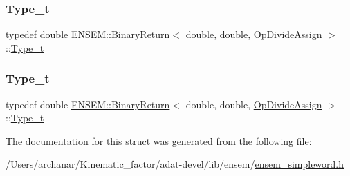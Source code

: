 \mbox{\label{structENSEM_1_1BinaryReturn_3_01double_00_01double_00_01OpDivideAssign_01_4_aa4a7939a8bbedada7f3b6703da6902f7}} 
\subsubsection{\texorpdfstring{Type\_t}{Type\_t}\hspace{0.1cm}{\footnotesize\ttfamily [2/3]}}
{\footnotesize\ttfamily typedef double \mbox{\hyperlink{structENSEM_1_1BinaryReturn}{E\+N\+S\+E\+M\+::\+Binary\+Return}}$<$ double, double, \mbox{\hyperlink{structENSEM_1_1OpDivideAssign}{Op\+Divide\+Assign}} $>$\+::\mbox{\hyperlink{structENSEM_1_1BinaryReturn_3_01double_00_01double_00_01OpDivideAssign_01_4_aa4a7939a8bbedada7f3b6703da6902f7}{Type\+\_\+t}}}

\mbox{\label{structENSEM_1_1BinaryReturn_3_01double_00_01double_00_01OpDivideAssign_01_4_aa4a7939a8bbedada7f3b6703da6902f7}} 
\subsubsection{\texorpdfstring{Type\_t}{Type\_t}\hspace{0.1cm}{\footnotesize\ttfamily [3/3]}}
{\footnotesize\ttfamily typedef double \mbox{\hyperlink{structENSEM_1_1BinaryReturn}{E\+N\+S\+E\+M\+::\+Binary\+Return}}$<$ double, double, \mbox{\hyperlink{structENSEM_1_1OpDivideAssign}{Op\+Divide\+Assign}} $>$\+::\mbox{\hyperlink{structENSEM_1_1BinaryReturn_3_01double_00_01double_00_01OpDivideAssign_01_4_aa4a7939a8bbedada7f3b6703da6902f7}{Type\+\_\+t}}}



The documentation for this struct was generated from the following file\+:\begin{DoxyCompactItemize}
\item 
/\+Users/archanar/\+Kinematic\+\_\+factor/adat-\/devel/lib/ensem/\mbox{\hyperlink{adat-devel_2lib_2ensem_2ensem__simpleword_8h}{ensem\+\_\+simpleword.\+h}}\end{DoxyCompactItemize}
